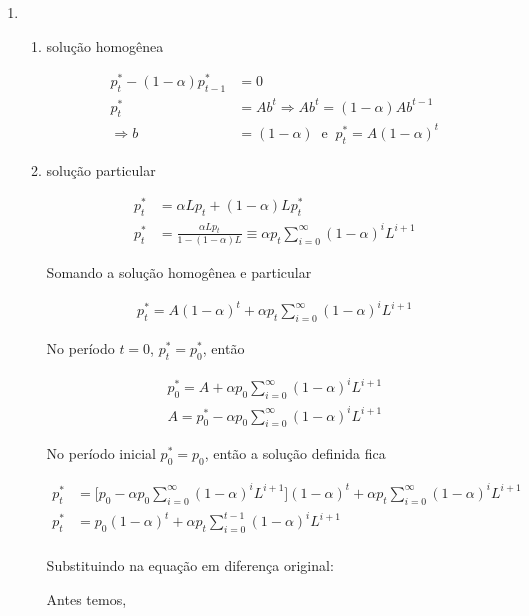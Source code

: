 \begin{enumerate}
	\item \begin{enumerate}\item solução homogênea
	
	\begin{align*}
		p^*_t-(1-\alpha)p^*_{t-1}&=0\\
		 p^*_t&=Ab^t\Rightarrow Ab^t=(1-\alpha)Ab^{t-1}\\
		\Rightarrow b&=(1-\alpha)\; \;\text{e}\;\; p_t^*=A(1-\alpha)^t
	\end{align*}
	
	\item solução particular
	
	 \begin{align*}
		p_t^*&=\alpha Lp_t +(1-\alpha)Lp_t^*\\
		p_t^*&=\frac{\alpha Lp_t}{1-(1-\alpha)L}\equiv \alpha p_t \sum \limits_{i=0}^{\infty}(1-\alpha)^iL^{i+1}
		\end{align*}
		
		Somando a solução homogênea e particular
		
		\begin{align*}
			p^*_t=A(1-\alpha)^t+ \alpha p_t \sum \limits_{i=0}^{\infty}(1-\alpha)^iL^{i+1}
		\end{align*}
		
		No período $t=0$, $p_t^*=p_0^*$, então
		
		\begin{align*}
			p_0^*=A+\alpha p_0 \sum \limits_{i=0}^{\infty}(1-\alpha)^iL^{i+1}\\
			A=p_0^*-\alpha p_0\sum \limits_{i=0}^{\infty}(1-\alpha)^iL^{i+1}
		\end{align*}
		
		No período inicial $p_0^*=p_0$, então a solução definida fica
		
		\begin{align*}
			p^*_t&=\Bigg[p_0-\alpha p_0\sum \limits_{i=0}^{\infty}(1-\alpha)^iL^{i+1}\Bigg](1-\alpha)^t+ \alpha p_t \sum \limits_{i=0}^{\infty}(1-\alpha)^iL^{i+1}\\
			p^*_t&=p_0(1-\alpha)^t+ \alpha p_t \sum \limits_{i=0}^{t-1}(1-\alpha)^iL^{i+1}\\
		\end{align*}
	
	Substituindo na equação em diferença original:
	
	Antes temos,
	

\end{enumerate}
\end{enumerate}
